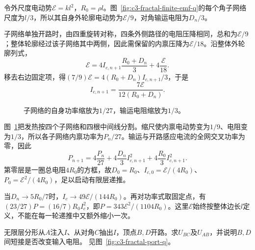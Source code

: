 \begin{solution}
令外尺度电动势$\mathcal E=kl^2$，$R_0=\rho l$。图~\ref{fig:c3-fractal-finite-emf-q}的每个角子网络尺度为$l/3$，所以其自身外轮廓电动势为$\mathcal E/9$，对角输运电阻为$D_n/3$。

子网络单独开路时，由四重旋转对称，四条外侧路径的电阻压降相同，总和为$\mathcal E/9$；整体轮廓经过该子网络其中两侧，因此需保留的内禀压降为$\mathcal E/18$。沿整体外轮廓列式，
\[
 \mathcal E=4I_{c,n+1}\frac{R_0+D_n}3+4\frac{\mathcal E}{18}.
\]
移去右边固定项，得$(7/9)\mathcal E=4(R_0+D_n)I_{c,n+1}/3$，于是
\[
 \boxed{I_{c,n+1}=\frac{7\mathcal E}{12(R_0+D_n)}}.
\]
\begin{figure}[H]\centering
{}
\caption{子网络的自身功率缩放为$1/27$，输运电阻缩放为$1/3$。}\label{fig:c3-fractal-finite-emf-s}
\end{figure}
图~\ref{fig:c3-fractal-finite-emf-s}把发热按四个子网络和四根中间线分割。缩尺使内禀电动势变为$1/9$、电阻变为$1/3$，所以各子网络内禀功率为$P_n/27$。输运与开路感应电流的全网交叉功率为零，因此
\[
 \boxed{P_{n+1}=4\frac{P_n}{27}
 +4\frac{D_n}3I_{c,n+1}^2+4\frac{R_0}3I_{c,n+1}^2}.
\]
第零层是一圈总电阻$4R_0$的方框，故$D_0=R_0$、$I_{c,0}=\mathcal E/(4R_0)$、$P_0=\mathcal E^2/(4R_0)$，足以启动有限层递推。

当$D_n\to5R_0/7$时，$I_c\to49\mathcal E/(144R_0)$。再对功率式取固定点，有$(23/27)P=(16/7)R_0I_c^2$，即$P=343\mathcal E^2/(1104R_0)$。这里$\mathcal E$始终按整体边长$l$定义，不能在每一轮递推中又额外缩小一次。
\end{solution}

\begin{example}[分形三端网络的开路电压]\label{ex:c3-fractal-port}
无限层分形从$A$注入$I$、从对角$C$抽出$I$，顶点$B,D$开路。求$U_{BC}$及$U_{AB}$，并说明$B,D$间短接是否改变输入电阻。 见图~\ref{fig:c3-fractal-port-q}。
\end{example}

